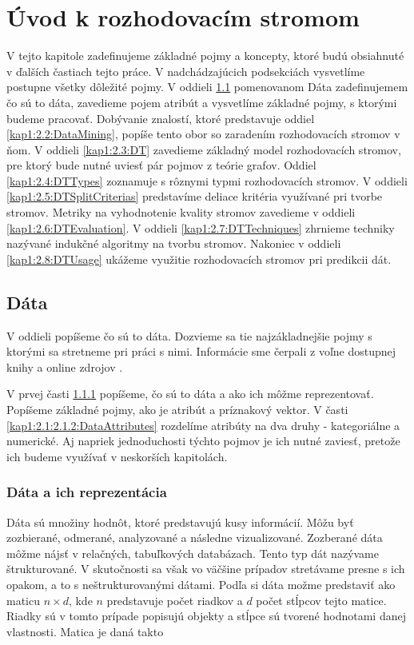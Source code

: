 \newcommand{\infogain}{\mbox{Info\_zisk}}
\newcommand{\entropy}{\mbox{Entropia}}
\newcommand{\ginindex}{\mbox{Gini\_zisk}}
\newcommand{\gini}{\mbox{Gini}}
\newcommand{\gainratio}{\mbox{Koef\_zisku}}
\newcommand{\twoing}{\mbox{Twoing}}

\chapter{Úvod k rozhodovacím stromom}
V tejto kapitole zadefinujeme základné pojmy a koncepty, ktoré budú obsiahnuté v ďalších častiach tejto práce. V nadchádzajúcich podsekciách vysvetlíme postupne všetky dôležité pojmy. V oddieli \ref{kap1:2.1:Data} pomenovanom Dáta zadefinujemem čo sú to dáta, zavedieme pojem atribút a  vysvetlíme základné pojmy, s ktorými budeme pracovať. Dobývanie znalostí, ktoré predstavuje oddiel \ref{kap1:2.2:DataMining}, popíše tento obor so zaradením rozhodovacích stromov v ňom. V oddieli \ref{kap1:2.3:DT} zavedieme základný model rozhodovacích stromov, pre ktorý bude nutné uviesť pár pojmov z teórie grafov. Oddiel \ref{kap1:2.4:DTTypes} zoznamuje s rôznymi typmi rozhodovacích stromov. V oddieli \ref{kap1:2.5:DTSplitCriterias} predstavíme deliace kritéria využívané pri tvorbe stromov. Metriky na vyhodnotenie kvality stromov zavedieme v oddieli \ref{kap1:2.6:DTEvaluation}. V oddieli \ref{kap1:2.7:DTTechniques} zhrnieme techniky nazývané indukčné algoritmy na tvorbu stromov.
Nakoniec v oddieli \ref{kap1:2.8:DTUsage} ukážeme využitie rozhodovacích stromov pri predikcii dát.

\section{Dáta}\label{kap1:2.1:Data}
V oddieli popíšeme čo sú to dáta. Dozvieme sa tie najzákladnejšie pojmy s ktorými sa stretneme pri práci s nimi. Informácie sme čerpali z voľne dostupnej knihy  \cite{kap1-DataMiningAndAnalysis} a online zdrojov \cite{wiki-Data,online-Data}.

V prvej časti \ref{kap1:2.1:2.1.1:DataRepresentation} popíšeme, čo sú to dáta a ako ich môžme reprezentovať. Popíšeme základné pojmy, ako je atribút a príznakový vektor. V časti \ref{kap1:2.1:2.1.2:DataAttributes} rozdelíme atribúty na dva druhy - kategoriálne a numerické. Aj napriek jednoduchosti týchto pojmov je ich nutné zaviesť, pretože ich budeme využívať v neskorších kapitolách.

\subsection{Dáta a ich reprezentácia}\label{kap1:2.1:2.1.1:DataRepresentation}
Dáta sú množiny hodnôt, ktoré predstavujú kusy informácií.
Môžu byť zozbierané, odmerané, analyzované a následne vizualizované.
Zozberané dáta môžme nájsť v relačných, tabuľkových databázach. Tento typ dát nazývame štrukturované. V skutočnosti sa však vo väčšine prípadov stretávame presne s ich opakom, a to s neštrukturovanými dátami.
Podľa \cite{kap1-DataMiningAndAnalysis} si dáta možme predstaviť ako maticu $n \times d$, kde $n$ predstavuje počet riadkov a $d$ počet stĺpcov tejto matice. Riadky sú v tomto prípade popisujú objekty a stĺpce sú tvorené hodnotami danej vlastnosti. Matica je daná takto

